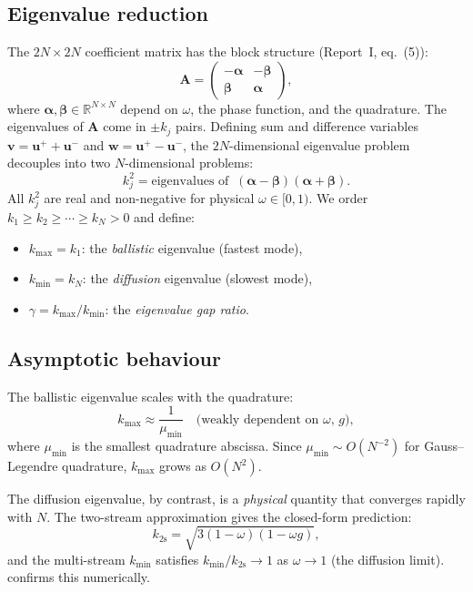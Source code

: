 \documentclass[11pt,a4paper]{article}
\newcommand{\R}{\mathbb{R}}
\newcommand{\vect}[1]{\bm{#1}}
\newcommand{\mat}[1]{\mathbf{#1}}
\newcommand{\kmax}{k_{\max}}
\newcommand{\kmin}{k_{\min}}
\theoremstyle{definition}
\begin{document}
\subsection{Eigenvalue reduction}

The $2N\!\times\!2N$ coefficient matrix has the block structure
(Report~I, eq.~(5)):
\begin{equation}\label{eq:A_blocks}
  \mat{A} = \begin{pmatrix}-\mat{\alpha} & -\mat{\beta}\\
  \mat{\beta} & \mat{\alpha}\end{pmatrix},
\end{equation}
where $\mat{\alpha},\mat{\beta}\in\R^{N\times N}$ depend on $\omega$,
the phase function, and the quadrature.  The eigenvalues of $\mat{A}$
come in $\pm k_j$ pairs.  Defining sum and difference variables
$\vect{v}=\vect{u}^+ + \vect{u}^-$ and $\vect{w}=\vect{u}^+ - \vect{u}^-$,
the $2N$-dimensional eigenvalue problem decouples into two
$N$-dimensional problems:
\begin{equation}\label{eq:k_reduction}
  k_j^2 = \text{eigenvalues of}\;\;
  (\mat{\alpha}-\mat{\beta})(\mat{\alpha}+\mat{\beta}).
\end{equation}
All $k_j^2$ are real and non-negative for physical $\omega\in[0,1)$.
We order $k_1 \geq k_2 \geq \cdots \geq k_N > 0$ and define:
\begin{itemize}[nosep]
\item $\kmax = k_1$: the \emph{ballistic} eigenvalue (fastest mode),
\item $\kmin = k_N$: the \emph{diffusion} eigenvalue (slowest mode),
\item $\gamma = \kmax/\kmin$: the \emph{eigenvalue gap ratio}.
\end{itemize}

\subsection{Asymptotic behaviour}

The ballistic eigenvalue scales with the quadrature:
\begin{equation}
  \kmax \approx \frac{1}{\mu_{\min}} \quad\text{(weakly dependent on $\omega$, $g$)},
\end{equation}
where $\mu_{\min}$ is the smallest quadrature abscissa.  Since
$\mu_{\min}\sim O(N^{-2})$ for Gauss--Legendre quadrature, $\kmax$
grows as $O(N^2)$.

The diffusion eigenvalue, by contrast, is a \emph{physical} quantity
that converges rapidly with $N$.  The two-stream approximation gives
the closed-form prediction:
\begin{equation}\label{eq:k_2s}
  k_{2\mathrm{s}} = \sqrt{3(1-\omega)(1-\omega g)},
\end{equation}
and the multi-stream $\kmin$ satisfies $\kmin/k_{2\mathrm{s}}\to 1$ as
$\omega\to 1$ (the diffusion limit).   confirms
this numerically.
\end{document}
